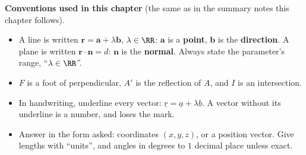 \begin{info}
\textbf{Conventions used in this chapter} (the same as in the summary notes this chapter follows).
\begin{itemize}
  \setlength{\itemsep}{1mm}
  \item A line is written $\mathbf{r} = \mathbf{a} + \lambda\mathbf{b}$, $\lambda\in\RR$: $\mathbf{a}$ is a \textbf{point}, $\mathbf{b}$ is the \textbf{direction}. A plane is written $\mathbf{r}\cdot\mathbf{n} = d$: $\mathbf{n}$ is the \textbf{normal}. Always state the parameter's range, ``$\lambda\in\RR$''.
  \item $F$ is a foot of perpendicular, $A'$ is the reflection of $A$, and $I$ is an intersection.
  \item In handwriting, underline every vector: $\underline{r} = \underline{a} + \lambda\underline{b}$. A vector without its underline is a number, and loses the mark.
  \item Answer in the form asked: coordinates $(x,y,z)$, or a position vector. Give lengths with ``units'', and angles in degrees to $1$ decimal place unless exact.
\end{itemize}
\end{info}
